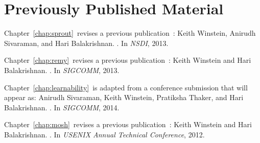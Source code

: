 \chapter*{Previously Published Material}
%

{
\setlength{\parindent}{0 pt}
\setlength{\parskip}{\baselineskip}

Chapter~\ref{chap:sprout}~revises a previous
publication~\cite{sprout}: Keith Winstein, Anirudh Sivaraman, and Hari
Balakrishnan.  .  \newblock In {\em NSDI},
2013.

Chapter~\ref{chap:remy}~revises a previous publication~\cite{remy}:
Keith Winstein and Hari Balakrishnan.  .  \newblock In {\em SIGCOMM},
2013.

Chapter~\ref{chap:learnability}~is adapted from a conference
submission that will appear as: Anirudh Sivaraman, Keith Winstein,
Pratiksha Thaker, and Hari Balakrishnan. . \newblock In {\em
  SIGCOMM}, 2014.

Chapter~\ref{chap:mosh}~revises a previous publication~\cite{mosh}:
Keith Winstein and Hari Balakrishnan.  .  \newblock In {\em USENIX Annual
  Technical Conference}, 2012.  }
